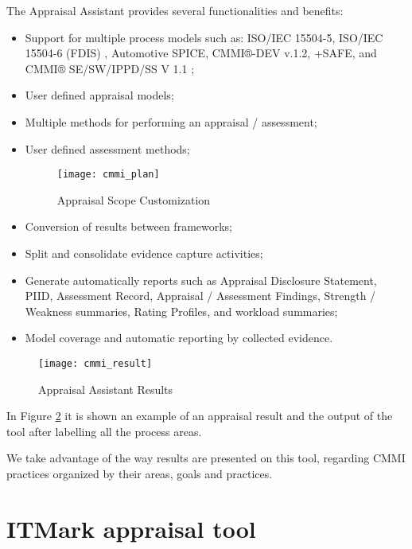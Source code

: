 The Appraisal Assistant provides several functionalities and benefits:
\begin{itemize}
	\item Support for multiple process models such as: ISO/IEC 15504-5, ISO/IEC 15504-6 (FDIS) \citep{rout2003iso}, Automotive SPICE, CMMI®-DEV v.1.2, +SAFE, and CMMI® SE/SW/IPPD/SS V 1.1 \citep{team2002capability};
	\item User defined appraisal models;
	\item Multiple methods for performing an appraisal / assessment;
	\item User defined assessment methods;
	\begin{figure}[h]
		\begin{center}
			\leavevmode
			\texttt{[image: cmmi\_plan]}
			\caption{Appraisal Scope Customization}
			\label{fig:cmmi_plan}
		\end{center}
	\end{figure}
	\item Conversion of results between frameworks;
	\item Split and consolidate evidence capture activities;
	\item Generate automatically reports such as Appraisal Disclosure Statement, PIID, Assessment Record, Appraisal / Assessment Findings, Strength / Weakness summaries, Rating Profiles, and workload summaries;
	\item Model coverage and automatic reporting by collected evidence.
\end{itemize}


\begin{figure}[h]
	\begin{center}
		\leavevmode
		\texttt{[image: cmmi\_result]}
		\caption{Appraisal Assistant Results}
		\label{fig:cmmi_result}
	\end{center}
\end{figure}

In Figure \ref{fig:cmmi_result} it is shown an example of an appraisal result and the output of the tool after labelling all the process areas.

We take advantage of the way results are presented on this tool, regarding CMMI practices organized by their areas, goals and practices.
\newpage


\section{ITMark appraisal tool}\label{itmarktool}

